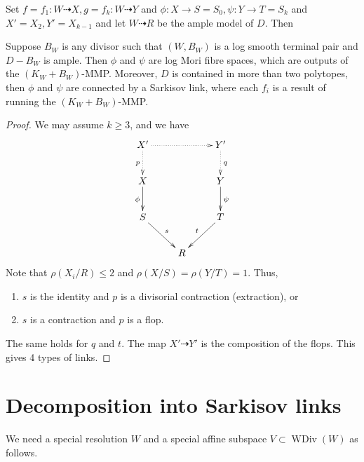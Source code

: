Set $ f=f_1:W\dashrightarrow X, g=f_k:W\dashrightarrow Y $ and $ \phi:X\to S=S_0,\psi:Y\to T=S_k $ and $ X'=X_2,Y'=X_{k-1} $ and let $ W\dashrightarrow R $ be the ample model of $ D $. Then
\begin{theorem}\label{constructlink}
  \cite[Theorem 3.7]{haconSarkisovProgram2012} Suppose $ B_W $ is any divisor such that $ (W,B_W) $ is a log smooth terminal pair and $ D-B_W $ is ample. Then $ \phi $ and $ \psi $ are log Mori fibre spaces, which are outputs of the $ (K_W+B_W) $-MMP. Moreover, $ D $ is contained in more than two polytopes, then $\phi$ and $\psi$ are connected by a Sarkisov link, where each $f_{i}$ is a result of running the $(K_{W}+B_{W})$-MMP.
\end{theorem}
\begin{proof}
  We may assume $ k\geqslant 3 $, and we have
  $$ \xymatrix{
      X'\ar@{.>}[d]_p\ar@{.>}[rr]&&Y'\ar@{.>}[d]^q\\
      X\ar[d]_{\phi}&&Y\ar[d]^\psi\\
      S\ar[rd]^s&&T\ar[ld]_t\\
      &R&} $$
  Note that $ \rho(X_i/R)\leqslant 2 $ and $ \rho(X/S)=\rho(Y/T)=1 $. Thus,
  \begin{enumerate}
    \item $ s $ is the identity and $ p $ is a divisorial contraction (extraction), or
    \item $ s $ is a contraction and $ p $ is a flop.
  \end{enumerate}
  The same holds for $ q $ and $ t $. The map $X'\dashrightarrow Y'$ is the composition of the flops. This gives 4 types of links.
\end{proof}

\section{Decomposition into Sarkisov links}
We need a special resolution $W$ and a special affine subspace $V \subset \operatorname{WDiv}(W)$ as follows.

